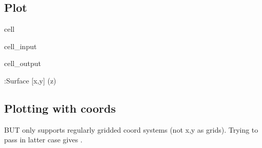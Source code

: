 \documentclass[letterpaper,10pt,english]{jupyterBook}
\begin{document}
\subsection{Plot}
\label{\detokenize{tests/plotly_surface_render_test:plot}}
\begin{sphinxuseclass}{cell}\begin{sphinxVerbatimInput}

\begin{sphinxuseclass}{cell_input}
\begin{sphinxVerbatim}[commandchars=\\\{\}]
  
\end{sphinxVerbatim}

\end{sphinxuseclass}\end{sphinxVerbatimInput}
\begin{sphinxVerbatimOutput}

\begin{sphinxuseclass}{cell_output}
\begin{sphinxVerbatim}[commandchars=\\\{\}]
:Surface   [x,y]   (z)
\end{sphinxVerbatim}

\end{sphinxuseclass}\end{sphinxVerbatimOutput}

\end{sphinxuseclass}

\subsection{Plotting with coords}
\label{\detokenize{tests/plotly_surface_render_test:plotting-with-coords}}
\sphinxAtStartPar
BUT only supports regularly gridded coord systems (not x,y as grids). Trying to pass  in latter case gives .
\end{document}

